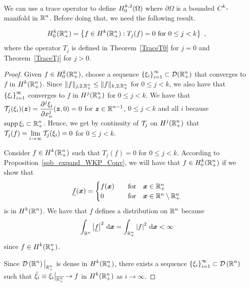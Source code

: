 We can use a trace operator to define $\displaystyle H^{k,2}_0(\Omega)$ where
$\partial \Omega$ is a bounded $\displaystyle C^k$-manifold in
$\displaystyle \mathbb{R}^n$.  Before doing that, we need the following result.

\begin{prop} \label{H0Trace}
\[
H^{k}_0(\mathbb{R}^n_+) = \left\{ f \in H^{k}(\mathbb{R}^n_+) : T_j(f) = 0
\ \text{for} \ 0 \leq j < k \right\} \ ,
\]
where the operator $T_j$ is defined in Theorem~\ref{TraceT0} for $j=0$
and Theorem~\ref{TraceTj} for $j>0$.
\end{prop}

\begin{proof}
\subI{$\mathbf{\subset}$}
Given $\displaystyle f \in H^k_0(\mathbb{R}^n_+)$, choose a sequence
$\displaystyle \left\{\xi_i\right\}_{i=1}^\infty \subset \mathcal{D}(\mathbb{R}^n_+)$
that converges to $f$ in $\displaystyle H^k(\mathbb{R}^n_+)$.
Since $\|f\|_{j,2,\mathbb{R}^n_+} \leq \|f\|_{k,2,\mathbb{R}^n_+}$ for $0\leq j < k$,
we also have that $\displaystyle \left\{\xi_i\right\}_{i=1}^\infty$
converges to $f$ in $\displaystyle H^j(\mathbb{R}^n_+)$ for $0\leq j < k$.
We have that $\displaystyle \mathcal{T}_j(\xi_i)({\bm{z}}) =
\frac{\displaystyle \partial^{j}{\xi_i}} {\displaystyle \partial x_n^{j}}({\bm{z}},0) = 0$ for
$\displaystyle {\bm{z}} \in \mathbb{R}^{n-1}$, $0 \leq j < k$
and all $i$ because $\displaystyle \operatorname{supp} \xi_i \subset \mathbb{R}^n_+$.
Hence, we get by continuity of $\mathcal{T}_j$ on $\displaystyle H^j(\mathbb{R}^n_+)$
that $\displaystyle \mathcal{T}_j(f) = \lim_{i\to \infty} \mathcal{T}_j(\xi_i) = 0$
for $0 \leq j < k$.

\subI{$\mathbf{\supset}$}
Consider $\displaystyle f \in H^{k}(\mathbb{R}^n_+)$ such that
$T_j(f) = 0$ for $0 \leq j < k$.
According to Proposition~\ref{sob_expand_WKP_Conv}, we 
will have that $\displaystyle f \in H^{k}_0(\mathbb{R}^n_+)$ if we show that
\[
\underline{f}({\bm{x}}) =
\begin{cases}
f({\bm{x}}) & \quad \text{for} \quad {\bm{x}} \in \mathbb{R}^n_+ \\
0 & \quad \text{for} \quad {\bm{x}} \in \mathbb{R}^n \setminus \mathbb{R}^n_+ \\
\end{cases}
\]
is in $\displaystyle H^{k}(\mathbb{R}^n)$.  We have that $\underline{f}$
defines a distribution on $\displaystyle \mathbb{R}^n$ because
\[
\int_{\mathbb{R}^n} \left|\underline{f}\right|^2 \,\mathrm{d}{{\bm{x}}}
= \int_{\mathbb{R}^n_+} \left|f\right|^2 \,\mathrm{d}{{\bm{x}}} < \infty
\]
since $\displaystyle f \in H^k(\mathbb{R}^n_+)$.

Since $\displaystyle \mathcal{D}\left(\mathbb{R}^n\right)\big|_{\mathbb{R}^n_+}$ is dense in
$\displaystyle H^k(\mathbb{R}^n_+)$, there exists a sequence
$\displaystyle \left\{\xi_i\right\}_{i=1}^\infty \subset
\mathcal{D}\left(\mathbb{R}^n\right)$ such that
$\displaystyle \tilde{\xi}_i \equiv \xi_i\big|_{\overline{\mathbb{R}^n_+}} \to f$ in
$\displaystyle H^k(\mathbb{R}^n_+)$ as $i \to \infty$.


\end{proof}
